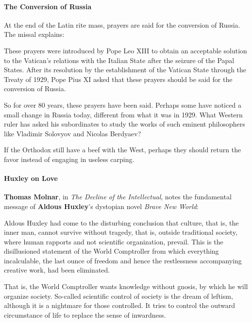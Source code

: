 \paragraph{The Conversion of Russia}
At the end of the Latin rite mass, prayers are said for the conversion of Russia. The missal explains:

\begin{quotex}
These prayers were introduced by Pope Leo XIII to obtain an acceptable solution to the Vatican's relations with the Italian State after the seizure of the Papal States. After its resolution by the establishment of the Vatican State through the Treaty of 1929, Pope Pius XI asked that these prayers should be said for the conversion of Russia.

\end{quotex}
So for over 80 years, these prayers have been said. Perhaps some have noticed a small change in Russia today, different from what it was in 1929. What Western ruler has asked his subordinates to study the works of such eminent philosophers like Vladimir Solovyov and Nicolas Berdyaev?

If the Orthodox still have a beef with the West, perhaps they should return the favor instead of engaging in useless carping.

\paragraph{Huxley on Love}
\textbf{Thomas Molnar}, in \emph{The Decline of the Intellectual}, notes the fundamental message of \textbf{Aldous Huxley}'s dystopian novel \emph{Brave New World}:

\begin{quotex}
Aldous Huxley had come to the disturbing conclusion that culture, that is, the inner man, cannot survive without tragedy, that is, outside traditional society, where human rapports and not scientific organization, prevail. This is the disillusioned statement of the World Comptroller from which everything incalculable, the last ounce of freedom and hence the restlessness accompanying creative work, had been eliminated.

\end{quotex}
That is, the World Comptroller wants knowledge without gnosis, by which he will organize society. So-called scientific control of society is the dream of leftism, although it is a nightmare for those controlled. It tries to control the outward circumstance of life to replace the sense of inwardness.

